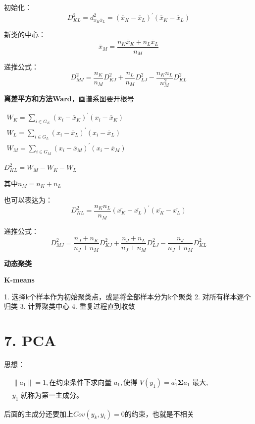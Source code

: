 \documentclass[10pt,a4paper]{ctexart} %
\begin{document}
\begin{multicols*}{3}
		初始化：
		$$D_{KL}^{2}=d_{x_{K}\bar{x}_{L}}^{2}=\left(\overline{x}_{K}-\overline{x}_{L}\right)^{\prime}\left(\overline{x}_{K}-\overline{x}_{L}\right)$$
		
		新类的中心：
		$$\overline{x}_M=\frac{n_K\overline{x}_K+n_L\overline{x}_L}{n_M}$$
		
		递推公式：
		$$D_{MJ}^{2}=\frac{n_{K}}{n_{M}}D_{KJ}^{2}+\frac{n_{L}}{n_{M}}D_{LJ}^{2}-\frac{n_{K}n_{L}}{n_{M}^{2}}D_{KL}^{2}$$
		
		\textbf{离差平方和方法Ward}，画谱系图要开根号
		
		$\begin{gathered}W_{K}=\sum_{i\in G_{K}}\left(x_{i}-\overline{x}_{K}\right)^{\prime}\left(x_{i}-\overline{x}_{K}\right)\\W_{L}=\sum_{i\in G_{L}}\left(x_{i}-\overline{x}_{L}\right)^{\prime}\left(x_{i}-\overline{x}_{L}\right)\\W_{M}=\sum_{i\in G_{M}}\left(x_{i}-\overline{x}_{M}\right)^{\prime}\left(x_{i}-\overline{x}_{M}\right)\end{gathered}$
		
		$D^2_{KL}=W_M-W_K-W_L$
		
		其中$n_M=n_K+n_L$
		
		也可以表达为：
		$$D^2_{KL}=\frac{n_Kn_L}{n_M}(\bar{x_K}-\bar{x_L})^{'}(\bar{x_K}-\bar{x_L})$$
		
		递推公式：
		$$D_{MJ}^{2}=\frac{n_{J}+n_{K}}{n_{J}+n_{M}}D_{KJ}^{2}+\frac{n_{J}+n_{L}}{n_{J}+n_{M}}D_{LJ}^{2}-\frac{n_{J}}{n_{J}+n_{M}}D_{KL}^{2}$$
		
		\textbf{动态聚类}
		
		\textbf{K-means}
		
		1. 选择k个样本作为初始聚类点，或是将全部样本分为k个聚类
		2. 对所有样本逐个归类
		3. 计算聚类中心
		4. 重复过程直到收敛
		
		\section*{\centering \normalsize 7. PCA}
		
		思想：
		
		$\begin{aligned}&\parallel a_1\parallel=1,\text{在约束条件下求向量 }a_1,\text{使得 }V(y_1)=a_1^{\prime}\boldsymbol{\Sigma}a_1\text{ 最大},\\&y_1\text{ 就称为第一主成分。}\end{aligned}$
		
		后面的主成分还要加上$Cov(y_k,y_i)=0$的约束，也就是不相关
		

\end{multicols*}
\end{document}
